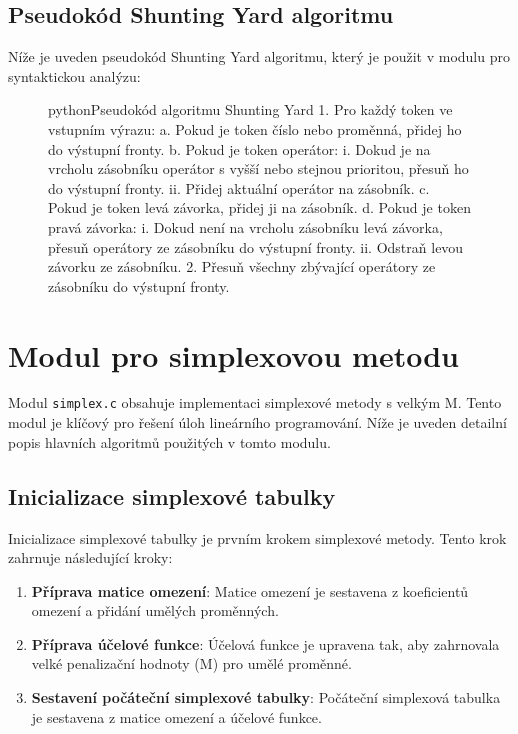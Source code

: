 \documentclass[czech, sem, kiv, he, pdf, viewonly]{fasthesis}
\begin{document}
\subsection{Pseudokód Shunting Yard algoritmu}

Níže je uveden pseudokód Shunting Yard algoritmu, který je použit v modulu pro syntaktickou analýzu:

\begin{figure}[H]
\begin{code}{python}{Pseudokód algoritmu Shunting Yard\label{lst:pseudoShunting}}
1. Pro každý token ve vstupním výrazu:
    a. Pokud je token číslo nebo proměnná, přidej ho do výstupní fronty.
    b. Pokud je token operátor:
        i. Dokud je na vrcholu zásobníku operátor s vyšší nebo stejnou prioritou, přesuň ho do výstupní fronty.
        ii. Přidej aktuální operátor na zásobník.
    c. Pokud je token levá závorka, přidej ji na zásobník.
    d. Pokud je token pravá závorka:
        i. Dokud není na vrcholu zásobníku levá závorka, přesuň operátory ze zásobníku do výstupní fronty.
        ii. Odstraň levou závorku ze zásobníku.
2. Přesuň všechny zbývající operátory ze zásobníku do výstupní fronty.
\end{code}
\end{figure}

\section{Modul pro simplexovou metodu}
Modul \texttt{simplex.c} obsahuje implementaci simplexové metody s velkým M. Tento modul je klíčový pro řešení úloh lineárního programování. Níže je uveden detailní popis hlavních algoritmů použitých v tomto modulu.

\subsection{Inicializace simplexové tabulky}

Inicializace simplexové tabulky je prvním krokem simplexové metody. Tento krok zahrnuje následující kroky:
\begin{enumerate}
    \item \textbf{Příprava matice omezení}: Matice omezení je sestavena z koeficientů omezení a přidání umělých proměnných.
    \item \textbf{Příprava účelové funkce}: Účelová funkce je upravena tak, aby zahrnovala velké penalizační hodnoty (M) pro umělé proměnné.
    \item \textbf{Sestavení počáteční simplexové tabulky}: Počáteční simplexová tabulka je sestavena z matice omezení a účelové funkce.
\end{enumerate}
\end{document}
